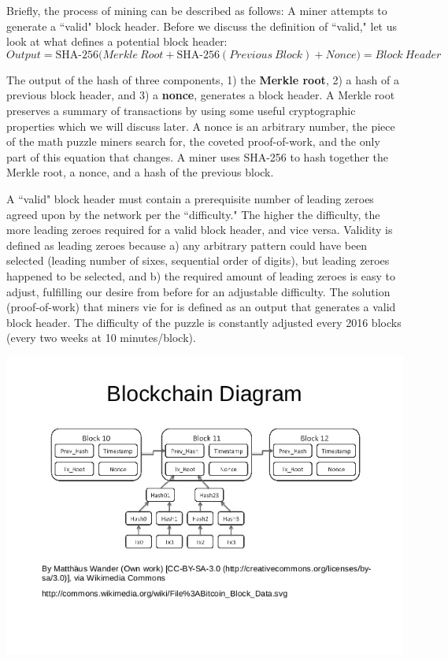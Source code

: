 \documentclass[11pt]{article}
\begin{document}
    Briefly, the process of mining can be described as follows: A miner attempts to generate a ``valid" block header. Before we discuss the definition of ``valid," let us look at what defines a potential block header:
    $$\mathit{Output} = \text{SHA-256}\big(\mathit{Merkle~Root} + \text{SHA-256}(\mathit{Previous~Block}) + \mathit{Nonce}\big) = \mathit{Block~Header}$$
    
    The output of the hash of three components, 1) the \textbf{Merkle root}, 2) a hash of a previous block header, and 3) a \textbf{nonce}, generates a block header. A Merkle root preserves a summary of transactions by using some useful cryptographic properties which we will discuss later. A nonce is an arbitrary number, the piece of the math puzzle miners search for, the coveted proof-of-work, and the only part of this equation that changes. A miner uses SHA-256 to hash together the Merkle root, a nonce, and a hash of the previous block. 
    
    A ``valid" block header must contain a prerequisite number of leading zeroes agreed upon by the network per the ``difficulty." The higher the difficulty, the more leading zeroes required for a valid block header, and vice versa. Validity is defined as leading zeroes because a) any arbitrary pattern could have been selected (leading number of sixes, sequential order of digits), but leading zeroes happened to be selected, and b) the required amount of leading zeroes is easy to adjust, fulfilling our desire from before for an adjustable difficulty. The solution (proof-of-work) that miners vie for is defined as an output that generates a valid block header. The difficulty of the puzzle is constantly adjusted every 2016 blocks (every two weeks at 10 minutes/block).
    
   \includegraphics[scale=0.65]{blockchain_diagram}
   
\end{document}
